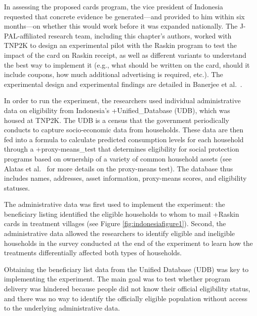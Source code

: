 \documentclass[
]{book}
\begin{document}
In assessing the proposed cards program, the vice president of Indonesia requested that concrete evidence be generated---and provided to him within six months---on whether this would work before it was expanded nationally. The J-PAL-affiliated research team, including this chapter's authors, worked with TNP2K to design an experimental pilot with the Raskin program to test the impact of the card on Raskin receipt, as well as different variants to understand the best way to implement it (e.g., what should be written on the card, should it include coupons, how much additional advertising is required, etc.). The experimental design and experimental findings are detailed in Banerjee et al.~\citeyearpar{banerjee2018}.

In order to run the experiment, the researchers used individual administrative data on eligibility from Indonesia's +Unified\_Database\textbar{} (UDB), which was housed at TNP2K. The UDB is a census that the government periodically conducts to capture socio-economic data from households. These data are then fed into a formula to calculate predicted consumption levels for each household through a +proxy-means\_test\textbar{} that determines eligibility for social protection programs based on ownership of a variety of common household assets (see Alatas et al.~\citeyearpar{alatas2012} for more details on the proxy-means test). The database thus includes names, addresses, asset information, proxy-means scores, and eligibility statuses.

The administrative data was first used to implement the experiment: the beneficiary listing identified the eligible households to whom to mail +Raskin\textbar{} cards in treatment villages (see Figure \ref{fig:indonesiafigure1}). Second, the administrative data allowed the researchers to identify eligible and ineligible households in the survey conducted at the end of the experiment to learn how the treatments differentially affected both types of households.

Obtaining the beneficiary list data from the Unified Database (UDB) was key to implementing the experiment. The main goal was to test whether program delivery was hindered because people did not know their official eligibility status, and there was no way to identify the officially eligible population without access to the underlying administrative data.
\end{document}

